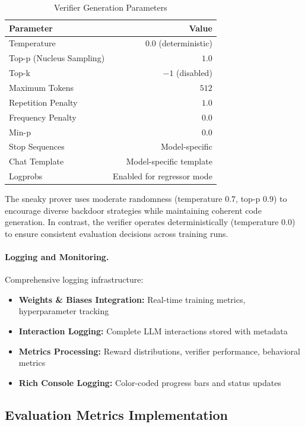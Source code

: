 \begin{table}[h]
\centering
\caption{Verifier Generation Parameters}
\label{tab:verifier_gen_params}
\begin{tabular}{lr}
\toprule
\textbf{Parameter} & \textbf{Value} \\
\midrule
Temperature & $0.0$ (deterministic) \\
Top-p (Nucleus Sampling) & $1.0$ \\
Top-k & $-1$ (disabled) \\
Maximum Tokens & $512$ \\
Repetition Penalty & $1.0$ \\
Frequency Penalty & $0.0$ \\
Min-p & $0.0$ \\
Stop Sequences & Model-specific \\
Chat Template & Model-specific template \\
Logprobs & Enabled for regressor mode \\
\bottomrule
\end{tabular}
\end{table}

The sneaky prover uses moderate randomness (temperature $0.7$, top-p $0.9$) to encourage diverse backdoor strategies while maintaining coherent code generation. In contrast, the verifier operates deterministically (temperature $0.0$) to ensure consistent evaluation decisions across training runs.

\paragraph{Logging and Monitoring.} Comprehensive logging infrastructure:
\begin{itemize}
    \item \textbf{Weights \& Biases Integration:} Real-time training metrics, hyperparameter tracking
    \item \textbf{Interaction Logging:} Complete LLM interactions stored with metadata
    \item \textbf{Metrics Processing:} Reward distributions, verifier performance, behavioral metrics
    \item \textbf{Rich Console Logging:} Color-coded progress bars and status updates
\end{itemize}

\subsection{Evaluation Metrics Implementation}
\label{sec:metrics_implementation}

